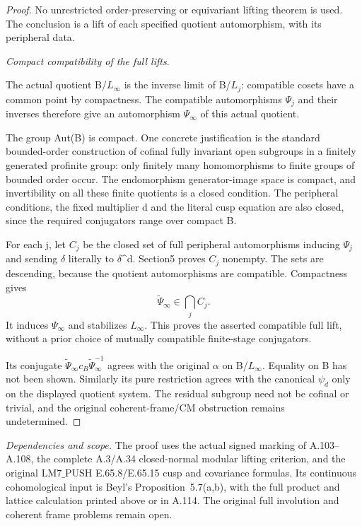 \begin{proof}
No unrestricted order-preserving or equivariant lifting theorem is used. The conclusion is a lift of each specified quotient automorphism, with its peripheral data.

\medskip\noindent\emph{Compact compatibility of the full lifts}.

The actual quotient B/\(L_\infty\) is the inverse limit of B/\(L_j\): compatible cosets have a common point by compactness. The compatible automorphisms \(\Psi_j\) and their inverses therefore give an automorphism \(\Psi_\infty\) of this actual quotient.

The group Aut(B) is compact. One concrete justification is the standard bounded-order construction of cofinal fully invariant open subgroups in a finitely generated profinite group: only finitely many homomorphisms to finite groups of bounded order occur. The endomorphism generator-image space is compact, and invertibility on all these finite quotients is a closed condition. The peripheral conditions, the fixed multiplier d and the literal cusp equation are also closed, since the required conjugators range over compact B.

For each j, let \(C_j\) be the closed set of full peripheral automorphisms inducing \(\Psi_j\) and sending \(\delta\) literally to \(\delta\)^d. Section5 proves \(C_j\) nonempty. The sets are descending, because the quotient automorphisms are compatible. Compactness gives
\[
\widetilde\Psi_\infty\in\bigcap_j C_j.
\]
It induces \(\Psi_\infty\) and stabilizes \(L_\infty\). This proves the asserted compatible full lift, without a prior choice of mutually compatible finite-stage conjugators.

Its conjugate \(\widetilde\Psi_\infty c_B\widetilde\Psi_\infty^{-1}\) agrees with the original \(\alpha\) on B/\(L_\infty\). Equality on B has not been shown. Similarly its pure restriction agrees with the canonical \(\psi_d\) only on the displayed quotient system. The residual subgroup need not be cofinal or trivial, and the original coherent-frame/CM obstruction remains undetermined.

\end{proof}
\noindent\emph{Dependencies and scope.}
The proof uses the actual signed marking of A.103--A.108,
the complete A.3/A.34 closed-normal modular lifting criterion,
and the original \(\mathrm{LM7\_PUSH}\) E.65.8/E.65.15 cusp and covariance
formulas. Its continuous cohomological input is Beyl's Proposition~5.7(a,b),
with the full product and lattice calculation printed above or in A.114.
The original full involution and coherent frame problems remain open.
